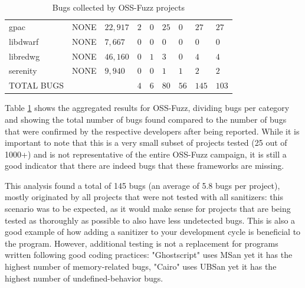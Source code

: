 \begin{table}[h!]
{\begin{tabular}{|l|l|l|l|l|l|l|l|l|}
gpac             & NONE                & $22,917$            & $2$         & $0$           & $25$          & $0$            & $27$            & $27$                \\
libdwarf         & NONE                & $7,667$             & $0$              & $0$           & $0$           & $0$            & $0$             & $0$                 \\
libredwg         & NONE                & $46,160$            & $0$              & $1$           & $3$           & $0$            & $4$             & $4$                 \\
serenity         & NONE                & $9,940$             & $0$              & $0$           & $1$           & $1$            & $2$             & $2$                 \\
\hline
TOTAL BUGS   &   &   &$4$   &$6$   &$80$   &$56$   &$145$   &$103$       \\
\hline
\end{tabular}}
\vspace{10pt}
\caption{Bugs collected by OSS-Fuzz projects}
\label{ossfuzz-table}
\end{table}
Table \ref{ossfuzz-table} shows the aggregated results for OSS-Fuzz, dividing bugs per category and showing the total number of bugs found compared to the number of bugs that were confirmed by the respective developers after being reported. While it is important to note that this is a very small subset of projects tested (25 out of 1000+) and is not representative of the entire OSS-Fuzz campaign, it is still a good indicator that there are indeed bugs that these frameworks are missing.

This analysis found a total of 145 bugs (an average of 5.8 bugs per project), mostly originated by all projects that were not tested with all sanitizers: this scenario was to be expected, as it would make sense for projects that are being tested as thoroughly as possible to also have less undetected bugs. This is also a good example of how adding a sanitizer to your development cycle is beneficial to the program. However, additional testing is not a replacement for programs written following good coding practices: "Ghostscript" uses MSan yet it has the highest number of memory-related bugs, "Cairo" uses UBSan yet it has the highest number of undefined-behavior bugs. 


